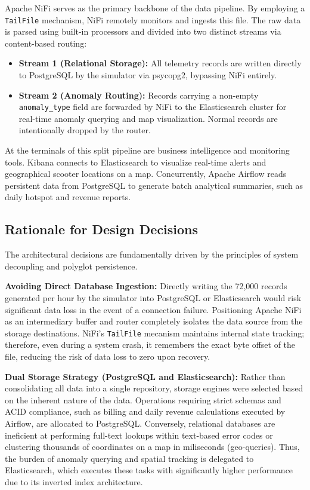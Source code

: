 \documentclass[conference]{IEEEtran}
\begin{document}
Apache NiFi serves as the primary backbone of the data pipeline. By employing a \texttt{TailFile} mechanism, NiFi remotely monitors and ingests this file. The raw data is parsed using built-in processors and divided into two distinct streams via content-based routing:
\begin{itemize}
    \item \textbf{Stream 1 (Relational Storage):} All telemetry records are written directly to PostgreSQL by the simulator via psycopg2, bypassing NiFi entirely.
    \item \textbf{Stream 2 (Anomaly Routing):} Records carrying a non-empty \texttt{anomaly\_type} field are forwarded by NiFi to the Elasticsearch cluster for real-time anomaly querying and map visualization. Normal records are intentionally dropped by the router.

\end{itemize}

At the terminals of this split pipeline are business intelligence and monitoring tools. Kibana connects to Elasticsearch to visualize real-time alerts and geographical scooter locations on a map. Concurrently, Apache Airflow reads persistent data from PostgreSQL to generate batch analytical summaries, such as daily hotspot and revenue reports.

\subsection{Rationale for Design Decisions}
The architectural decisions are fundamentally driven by the principles of system decoupling and polyglot persistence.

\textbf{Avoiding Direct Database Ingestion:} Directly writing the 72,000 records generated per hour by the simulator into PostgreSQL or Elasticsearch would risk significant data loss in the event of a connection failure. Positioning Apache NiFi as an intermediary buffer and router completely isolates the data source from the storage destinations. NiFi’s \texttt{TailFile} mecanism maintains internal state tracking; therefore, even during a system crash, it remembers the exact byte offset of the file, reducing the risk of data loss to zero upon recovery.

\textbf{Dual Storage Strategy (PostgreSQL and Elasticsearch):} Rather than consolidating all data into a single repository, storage engines were selected based on the inherent nature of the data. Operations requiring strict schemas and ACID compliance, such as billing and daily revenue calculations executed by Airflow, are allocated to PostgreSQL. Conversely, relational databases are ineficient at performing full-text lookups within text-based error codes or clustering thousands of coordinates on a map in miliseconds (geo-queries). Thus, the burden of anomaly querying and spatial tracking is delegated to Elasticsearch, which executes these tasks with significantly higher performance due to its inverted index architecture.
\end{document}
